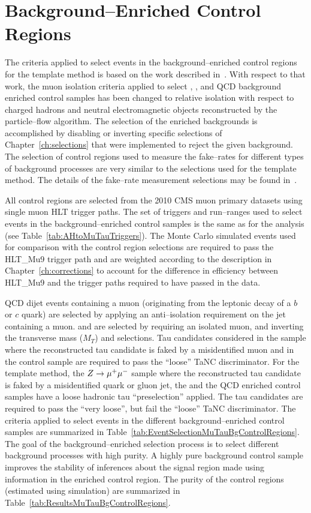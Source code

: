 \section{Background--Enriched Control Regions}
\label{sec:controlregions}
%
The criteria applied to select events in the background--enriched control regions
for the template method is based on the work described
in~\cite{CMS_AN_2010-088}.  With respect to that work, the muon isolation
criteria applied to select \ZMM, \WpJets, \ttbarpJets and QCD background
enriched control samples has been changed to relative isolation with respect to
charged hadrons and neutral electromagnetic objects reconstructed by the
particle--flow algorithm.   The selection of the enriched backgrounds is
accomplished by disabling or inverting specific selections of
Chapter~\ref{ch:selections} that were implemented to reject the given
background.  The selection of control regions used to measure the fake--rates
for different types of background processes are very similar to the selections
used for the template method.  The details of the fake--rate measurement
selections may be found in~\cite{CMS-PAS-TAU-11-001}.

All control regions are selected from the 2010 CMS muon primary datasets using
single muon HLT trigger paths.  The set of triggers and run--ranges used to select events in the
background--enriched control samples is the same as for the analysis (see
Table~\ref{tab:AHtoMuTauTriggers}).  The Monte Carlo simulated events used for
comparison with the control region selections are required to pass the HLT\_Mu9
trigger path and are weighted according to the description in
Chapter~\ref{ch:corrections} to account for the difference in
efficiency between HLT\_Mu9 and the trigger paths required to have passed in the
data.

QCD dijet events containing a muon (originating from the leptonic decay of a
$b$ or $c$ quark) are selected by applying an anti--isolation requirement
on the jet containing a muon.  \WpJets and \ttbarpJets are selected by requiring
an isolated muon, and inverting the transverse mass ($M_T$) and \Pzeta
selections.   Tau candidates considered in the \ZMM sample where the
reconstructed tau candidate is faked by a misidentified muon and in the
\ttbarpJets control sample are required to pass the ``loose'' TaNC
discriminator.  For the template method, the $\mbox{\ensuremath{Z\to\mu^+\mu^-}}$ sample where the
reconstructed tau candidate is faked by a misidentified quark or gluon jet,
the \WpJets and the QCD enriched control samples have a loose hadronic tau
``preselection'' applied. The tau candidates are required to pass the
``very loose'', but fail the ``loose'' TaNC discriminator.  The criteria applied
to select events in the different background--enriched control samples are
summarized in Table~\ref{tab:EventSelectionMuTauBgControlRegions}.  The goal of
the background--enriched selection process is to select different background
processes with high purity.  A highly pure background control sample improves
the stability of inferences about the signal region made using information in
the enriched control region.  The purity of the control regions (estimated using
simulation) are summarized in Table~\ref{tab:ResultsMuTauBgControlRegions}.

